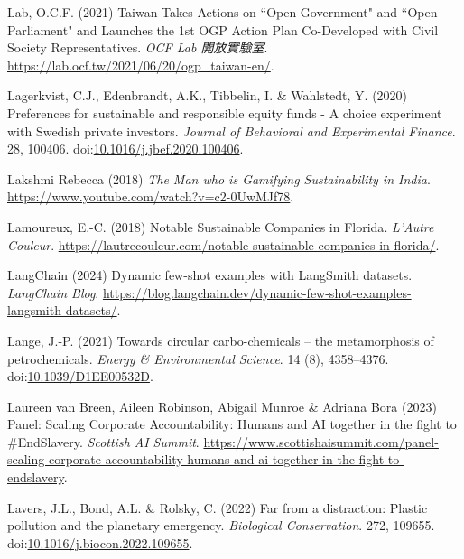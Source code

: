 \documentclass[
  letterpaper,
  DIV=11,
  numbers=noendperiod]{scrartcl}
\newlength{\cslhangindent}
\newenvironment{CSLReferences}[2] %
 {\begin{list}{}{%
  \setlength{\itemindent}{0pt}
  \setlength{\leftmargin}{0pt}
  \setlength{\parsep}{0pt}
  \ifodd #1
   \setlength{\leftmargin}{\cslhangindent}
   \setlength{\itemindent}{-1\cslhangindent}
  \fi
  \setlength{\itemsep}{#2\baselineskip}}}
 {\end{list}}
\begin{document}
\begin{CSLReferences}{0}{1}
Lab, O.C.F. (2021) {Taiwan Takes Actions on ``Open Government" and
``Open Parliament" and Launches the 1st OGP Action Plan Co-Developed
with Civil Society Representatives}. \emph{OCF Lab 開放實驗室}.
\url{https://lab.ocf.tw/2021/06/20/ogp_taiwan-en/}.

Lagerkvist, C.J., Edenbrandt, A.K., Tibbelin, I. \& Wahlstedt, Y. (2020)
Preferences for sustainable and responsible equity funds - {A} choice
experiment with {Swedish} private investors. \emph{Journal of Behavioral
and Experimental Finance}. 28, 100406.
doi:\href{https://doi.org/10.1016/j.jbef.2020.100406}{10.1016/j.jbef.2020.100406}.

Lakshmi Rebecca (2018) \emph{The {Man} who is {Gamifying Sustainability}
in {India}}. \url{https://www.youtube.com/watch?v=c2-0UwMJf78}.

Lamoureux, E.-C. (2018) Notable {Sustainable Companies} in {Florida}.
\emph{L'Autre Couleur}.
\url{https://lautrecouleur.com/notable-sustainable-companies-in-florida/}.

LangChain (2024) Dynamic few-shot examples with {LangSmith} datasets.
\emph{LangChain Blog}.
\url{https://blog.langchain.dev/dynamic-few-shot-examples-langsmith-datasets/}.

Lange, J.-P. (2021) Towards circular carbo-chemicals -- the
metamorphosis of petrochemicals. \emph{Energy \& Environmental Science}.
14 (8), 4358--4376.
doi:\href{https://doi.org/10.1039/D1EE00532D}{10.1039/D1EE00532D}.

Laureen van Breen, Aileen Robinson, Abigail Munroe \& Adriana Bora
(2023) Panel: {Scaling Corporate Accountability}: {Humans} and {AI}
together in the fight to \#{EndSlavery}. \emph{Scottish AI Summit}.
\url{https://www.scottishaisummit.com/panel-scaling-corporate-accountability-humans-and-ai-together-in-the-fight-to-endslavery}.

Lavers, J.L., Bond, A.L. \& Rolsky, C. (2022) Far from a distraction:
{Plastic} pollution and the planetary emergency. \emph{Biological
Conservation}. 272, 109655.
doi:\href{https://doi.org/10.1016/j.biocon.2022.109655}{10.1016/j.biocon.2022.109655}.


\end{CSLReferences}
\end{document}
